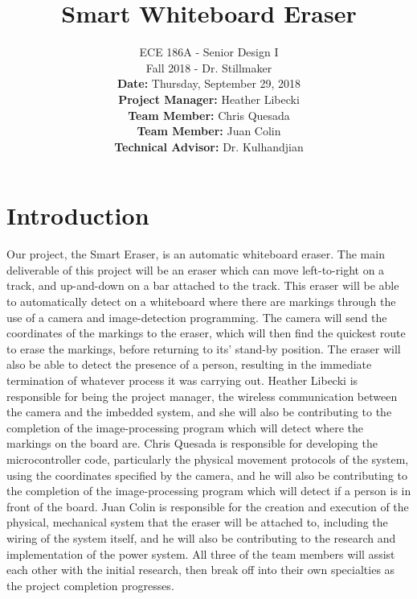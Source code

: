 \documentclass{IEEEtran}					%
\title{\vspace{2in}Smart Whiteboard Eraser}	%
\author{ECE 186A - Senior Design I \\ 			%
	Fall 2018 - Dr. Stillmaker \\ 				%
	\vspace{12pt} 								%
	\textbf{Date:} Thursday, September 29, 2018  \\ 
	\vspace{2in}								%
	\vspace{6pt}
	\textbf{Project Manager:} Heather Libecki			%
	\vspace{6pt}
	\underline{\hspace{3in}}\par					%
	\textbf{Team Member:} Chris Quesada
	\vspace{6pt}
	\underline{\hspace{3in}}\par
	\textbf{Team Member:} Juan Colin
	\vspace{6pt}
	\underline{\hspace{3in}}\par
	\textbf{Technical Advisor:} Dr. Kulhandjian
	\underline{\hspace{3in}} \\
	\vspace{4in}}								%
\begin{document}
	\thispagestyle{empty}						%
	
	\maketitle									%
	
	
	\section{Introduction}
	Our project, the Smart Eraser, is an automatic whiteboard eraser. The main deliverable of this project will be an eraser which can move left-to-right on a track, and up-and-down on a bar attached to the track. This eraser will be able to automatically detect on a whiteboard where there are markings through the use of a camera and image-detection programming. The camera will send the coordinates of the markings to the eraser, which will then find the quickest route to erase the markings, before returning to its’ stand-by position. The eraser will also be able to detect the presence of a person, resulting in the immediate termination of whatever process it was carrying out.
	Heather Libecki is responsible for being the project manager, the wireless communication between the camera and the imbedded system, and she will also be contributing to the completion of the image-processing program which will detect where the markings on the board are. Chris Quesada is responsible for developing the microcontroller code, particularly the physical movement protocols of the system, using the coordinates specified by the camera, and he will also be contributing to the completion of the image-processing program which will detect if a person is in front of the board. Juan Colin is responsible for the creation and execution of the physical, mechanical system that the eraser will be attached to, including the wiring of the system itself, and he will also be contributing to the research and implementation of the power system. All three of the team members will assist each other with the initial research, then break off into their own specialties as the project completion progresses.
	
\end{document}
